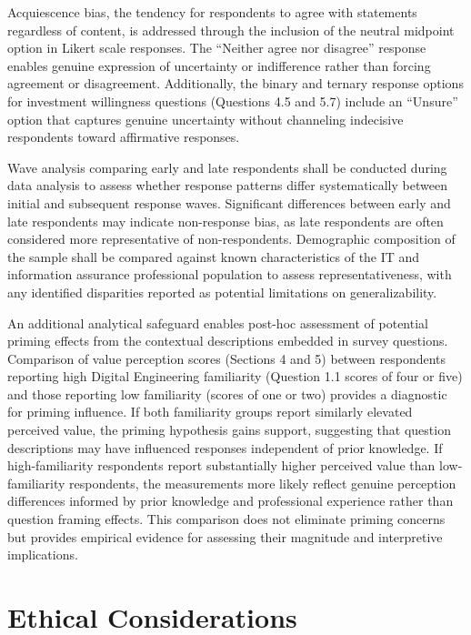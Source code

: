 Acquiescence bias, the tendency for respondents to agree with statements regardless of content, is addressed through the inclusion of the neutral midpoint option in Likert scale responses. The ``Neither agree nor disagree'' response enables genuine expression of uncertainty or indifference rather than forcing agreement or disagreement. Additionally, the binary and ternary response options for investment willingness questions (Questions 4.5 and 5.7) include an ``Unsure'' option that captures genuine uncertainty without channeling indecisive respondents toward affirmative responses.

Wave analysis comparing early and late respondents shall be conducted during data analysis to assess whether response patterns differ systematically between initial and subsequent response waves. Significant differences between early and late respondents may indicate non-response bias, as late respondents are often considered more representative of non-respondents. Demographic composition of the sample shall be compared against known characteristics of the IT and information assurance professional population to assess representativeness, with any identified disparities reported as potential limitations on generalizability.

An additional analytical safeguard enables post-hoc assessment of potential priming effects from the contextual descriptions embedded in survey questions. Comparison of value perception scores (Sections 4 and 5) between respondents reporting high Digital Engineering familiarity (Question 1.1 scores of four or five) and those reporting low familiarity (scores of one or two) provides a diagnostic for priming influence. If both familiarity groups report similarly elevated perceived value, the priming hypothesis gains support, suggesting that question descriptions may have influenced responses independent of prior knowledge. If high-familiarity respondents report substantially higher perceived value than low-familiarity respondents, the measurements more likely reflect genuine perception differences informed by prior knowledge and professional experience rather than question framing effects. This comparison does not eliminate priming concerns but provides empirical evidence for assessing their magnitude and interpretive implications.

\section{Ethical Considerations}

